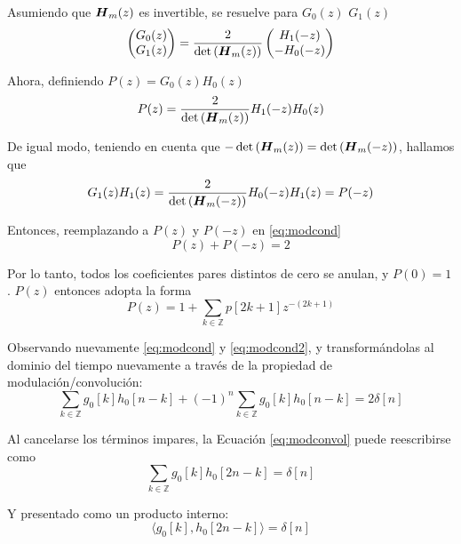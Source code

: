 	Asumiendo que $\boldsymbol{H}_m(z)$ es invertible, se resuelve para $G_0(z)$ $G_1(z)$
		\begin{equation}
			\begin{pmatrix}
				G_0(z) \\
				G_1(z)
			\end{pmatrix}
			=
			\frac{2}{\det{(\boldsymbol{H}_m(z))}}
			\begin{pmatrix}
				H_1(-z) \\
				-H_0(-z)
			\end{pmatrix}
		\end{equation}
		
	Ahora, definiendo $P(z)=G_0(z)H_0(z)$
		\begin{equation}
			P(z)=\frac{2}{\det{(\boldsymbol{H}_m(z))}}H_1(-z)H_0(z)
		\end{equation}

	De igual modo, teniendo en cuenta que $-\det{(\boldsymbol{H}_m(z))}=\det{(\boldsymbol{H}_m(-z))}$, hallamos que
		\begin{equation}
			G_1(z)H_1(z)=\frac{2}{\det{(\boldsymbol{H}_m(-z))}}H_0(-z)H_1(z)=P(-z)
		\end{equation}

	Entonces, reemplazando a $P(z)$ y $P(-z)$ en  \eqref{eq:modcond}
		\begin{equation}
			P(z)+P(-z)=2
		\end{equation}
	
	Por lo tanto, todos los coeficientes pares distintos de cero se anulan, y $P(0)=1$. $P(z)$ entonces adopta la forma
		\begin{equation}
			P(z)=1+\sum_{k\in\mathbb{Z}} p[2k+1]z^{-(2k+1)}
		\end{equation}
	
	Observando nuevamente \eqref{eq:modcond} y \eqref{eq:modcond2}, y transformándolas al dominio del tiempo nuevamente a través de la propiedad de modulación/convolución: 
		\begin{equation}
			\sum_{k\in\mathbb{Z}}g_0[k]h_0[n-k]+(-1)^n\sum_{k\in\mathbb{Z}}g_0[k]h_0[n-k]=2\delta[n]
			\label{eq:modconvol}
		\end{equation}

	Al cancelarse los términos impares, la Ecuación \eqref{eq:modconvol} puede reescribirse como
		\begin{equation}
			\sum_{k\in\mathbb{Z}}g_0[k]h_0[2n-k]=\delta[n]
		\end{equation}

	Y presentado como un producto interno:
		\begin{equation}
			\langle g_0[k],h_0[2n-k] \rangle=\delta[n]
		\end{equation}

